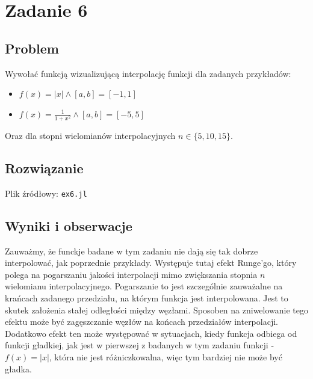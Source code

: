 \documentclass[11pt]{article}
\begin{document}
\section*{Zadanie 6}
    \subsection*{Problem}
        Wywołać funkcją wizualizującą interpolację funkcji dla zadanych przykładów:
        \begin{itemize}
            \item $f(x) = |x| \land [a, b] = [-1, 1]$
            \item $f(x) = \frac{1}{1 + x^2} \land [a, b] = [-5, 5]$
        \end{itemize}
        Oraz dla stopni wielomianów interpolacyjnych $n \in \{5, 10, 15\}$.

    \subsection*{Rozwiązanie}
        Plik źródłowy: \texttt{ex6.jl}

    \subsection*{Wyniki i obserwacje}
        Zauważmy, że funckje badane w tym zadaniu nie dają się tak dobrze interpolować, jak poprzednie przykłady.
        Występuje tutaj efekt Runge'go, który polega na pogarszaniu jakości interpolacji mimo zwiększania stopnia $n$
        wielomianu interpolacyjnego. Pogarszanie to jest szczególnie zauważalne na krańcach zadanego przedziału, na
        którym funkcja jest interpolowana. Jest to skutek założenia stałej odległości między węzłami. Sposoben na
        zniwelowanie tego efektu może być zagęszczanie węzłów na końcach przedziałów interpolacji.
        \newline
        Dodatkowo efekt ten może występować w sytuacjach, kiedy funkcja odbiega od funkcji gładkiej, jak jest w
        pierwszej z badanych w tym zadaniu funkcji - $f(x) = |x|$, która nie jest różniczkowalna, więc tym bardziej
        nie może być gładka.

        \noindent\newline
\end{document}
